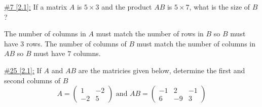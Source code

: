 \documentclass{exam}
\begin{document}
\underline{\#7 [2.1]:} If a matrix $A$ is $5 \times 3$ and the product $AB$ is $5 \times 7$, what is the size of $B$?
\begin{solution}
    The number of columns in $A$ must match the number of rows in $B$ so $B$ must have $3$ rows. The number of columns of $B$ must match the number of columns in $AB$ so $B$ must have $7$ columns.\ 
\end{solution}


\underline{\#25 [2.1]:} If $A$ and $AB$ are the matricies given below, determine the first and second columns of $B$
\[
    A = \begin{pmatrix}
        1 & -2 \\ -2 & 5
    \end{pmatrix}
    \text{ and } 
    AB = \begin{pmatrix}
        -1 & 2 & -1 \\
        6 & -9 & 3
    \end{pmatrix}
\]
\end{document}
